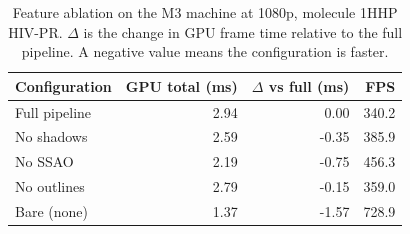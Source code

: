 \begin{table}[H]
    \centering
    \small
    \begin{tabular}{lrrr}
        \toprule
        Configuration & GPU total (ms) & $\Delta$ vs full (ms) & FPS \\
        \midrule
        Full pipeline & 2.94 & 0.00 & 340.2 \\
        No shadows & 2.59 & -0.35 & 385.9 \\
        No SSAO & 2.19 & -0.75 & 456.3 \\
        No outlines & 2.79 & -0.15 & 359.0 \\
        Bare (none) & 1.37 & -1.57 & 728.9 \\
        \bottomrule
    \end{tabular}
    \caption{Feature ablation on the M3 machine at 1080p, molecule 1HHP HIV-PR. $\Delta$ is the change in GPU frame time relative to the full pipeline. A negative value means the configuration is faster.}
    \label{tab:ablation_m3}
\end{table}
